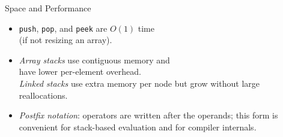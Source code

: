 \documentclass[14pt,aspectratio=1610]{beamer}
\begin{document}
\begin{frame}{Space and Performance}
\begin{itemize}
  \item 
    \lstinline{push}, \lstinline{pop}, and \lstinline{peek} are \(O(1)\) time\\ (if not resizing an array).
  \item 
    \textit{Array stacks} use contiguous memory and\\ have
  lower per-element overhead.\\
  \textit{Linked stacks} use extra memory per node but
  grow without large reallocations.
  \item 
    \emph{Postfix notation}: operators are written after the operands; this
  form is convenient for stack-based evaluation and for compiler internals.
\end{itemize}
\end{frame}
\end{document}
